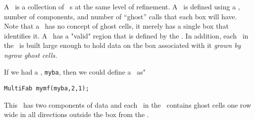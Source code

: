 A \MultiFab\ is a collection of \Fab~s at the same level of
refinement.  A \MultiFab\ is defined using a \BoxArray,
number of components, and number of ``ghost'' calls that each box
will have.  Note that a \Fab\ has no concept of ghost cells, it
merely has a single box that identifies it.  A \MultiFab\ has
a "valid" region that is defined by the \BoxArray.  In addition,
each \Fab\ in the \MultiFab\ is built large enough to hold data
on the box associated with it {\it grown by ngrow ghost cells.}

If we had a \BoxArray, {\tt myba}, then we could define a \MultiFab\ as"

\begin{verbatim}
MultiFab mymf(myba,2,1);
\end{verbatim}

This \MultiFab\ has two components of data and each \Fab\ in the \MultiFab\ contains ghost cells one row wide in all directions outside the box from the \BoxArray.

